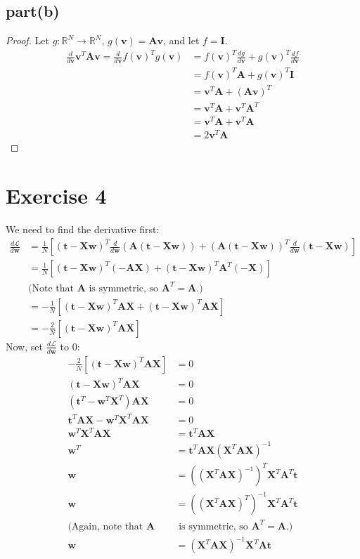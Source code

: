 \documentclass[12pt]{amsart}
\newcommand{\vect}[1]{\mathbf{#1}}
\begin{document}
\subsection*{part(b)}
\begin{proof}
Let $g:\mathbb{R}^N\to\mathbb{R}^N$, $g(\vect{v})=\vect{A}\vect{v}$, and let $f=\textbf{I}$.
\begin{align*}
    \frac{d}{d\vect{v}}\vect{v}^T\vect{A}\vect{v}
    = \frac{d}{d\vect{v}}f(\vect{v})^T g(\vect{v})
    &=f(\vect{v})^T \frac{dg}{d\vect{v}}
    + g(\vect{v})^T  \frac{df}{d\vect{v}}\\
    &= f(\vect{v})^T \vect{A}
    +g(\vect{v})^T\vect{I}\\
&= \vect{v}^T\vect{A}+(\vect{A}\vect{v})^T\\
&= \vect{v}^T\vect{A} + \vect{v}^T\vect{A}^T\\
&= \vect{v}^T\vect{A} + \vect{v}^T\vect{A}\\
&= 2\vect{v}^T\vect{A}
\end{align*}
\end{proof}
\section*{Exercise 4}
We need to find the derivative first:
\begin{align*}
   \frac{d\mathcal{L}}{d\vect{w}}&=\frac{1}{N}[
   (\vect{t}-\vect{Xw})^T \frac{d}{d\vect{w}}(\vect{A(t-Xw)}) +
   (\vect{A(t-Xw)})^T \frac{d}{d\vect{w}}(\vect{t}-\vect{Xw})
   ]\\
   &= \frac{1}{N}[(\vect{t}-\vect{Xw})^T(-\vect{AX})+ \vect{(t-Xw)}^T\vect{A}^T(-\vect{X})]\\
   &\mbox{(Note that $\vect{A}$ is symmetric, so $\vect{A}^T = \vect{A}$.)}\\
   & = -\frac{1}{N}[\vect{(t-Xw)}^T\vect{AX}+\vect{(t-Xw)}^T\vect{AX}]\\
   & = -\frac{2}{N}[\vect{(t-Xw)}^T\vect{AX}]
\end{align*}
Now, set $ \frac{d\mathcal{L}}{d\vect{w}}$ to $0$:
\begin{align*}
    -\frac{2}{N}[\vect{(t-Xw)}^T\vect{AX}]&=0\\
    \vect{(t-Xw)}^T\vect{AX}&=0\\
    (\vect{t}^T-\vect{w}^T\vect{X}^T)\vect{AX}&=0\\
    \vect{t}^T\vect{AX}-\vect{w}^T\vect{X}^T\vect{AX}&=0\\
    \vect{w}^T\vect{X}^T\vect{AX} &=\vect{t}^T\vect{AX}\\
    \vect{w}^T&=\vect{t}^T\vect{AX}(\vect{X}^T\vect{AX})^{-1}\\
    \vect{w} &= ((\vect{X}^T\vect{AX})^{-1})^{T}\vect{X}^T\vect{A}^T\vect{t}\\
    \vect{w} &= ((\vect{X}^T\vect{AX})^{T})^{-1}\vect{X}^T\vect{A}^T\vect{t}\\
    \mbox{(Again, note that $\vect{A}$}&\mbox{  is symmetric, so $\vect{A}^T = \vect{A}$.)}\\
    \vect{w} &=(\vect{X}^T\vect{AX})^{-1}\vect{X}^T\vect{A}\vect{t}
\end{align*}
\end{document}
